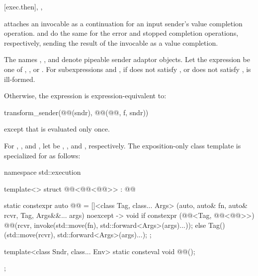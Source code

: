 [exec.then]{, , }

\pnum
{} attaches an invocable as a continuation
for an input sender's value completion operation.
 and  do the same
for the error and stopped completion operations, respectively,
sending the result of the invocable as a value completion.

\pnum
The names , , and 
denote pipeable sender adaptor objects.
Let the expression  be one of
, , or .
For subexpressions  and ,
if  does not satisfy , or
 does not satisfy ,
is ill-formed.

\pnum
Otherwise,
the expression  is expression-equivalent to:
\begin{codeblock}
transform_sender(@@(sndr), @@(@@, f, sndr))
\end{codeblock}
except that  is evaluated only once.

\pnum
For , , and ,
let  be
, , and , respectively.
The exposition-only class template 
is specialized for  as follows:
\begin{codeblock}
namespace std::execution {
  template<>
  struct @@<@@<@@>> : @@ {
    static constexpr auto @@ =
      []<class Tag, class... Args>
        (auto, auto& fn, auto& rcvr, Tag, Args&&... args) noexcept -> void {
          if constexpr (@@<Tag, @@<@@>>) {
            @@(rcvr,
                          invoke(std::move(fn), std::forward<Args>(args)...));
          } else {
            Tag()(std::move(rcvr), std::forward<Args>(args)...);
          }
        };

    template<class Sndr, class... Env>
      static consteval void @@();
  };
}
\end{codeblock}

